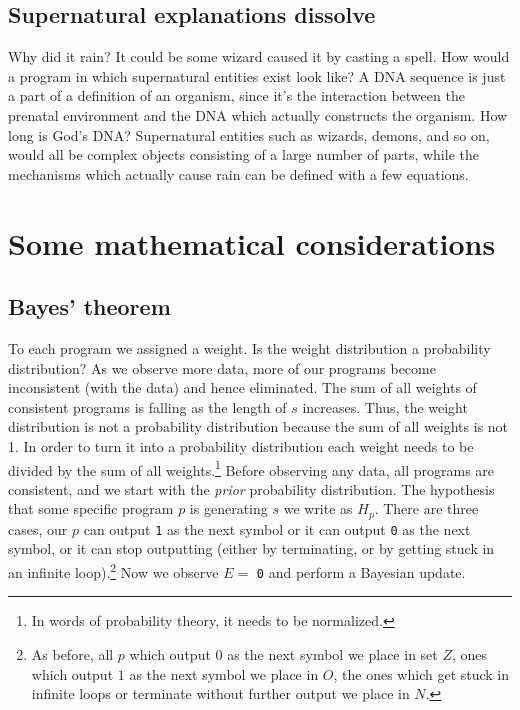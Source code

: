 \documentclass[oneside,hidelinks]{article}
\begin{document}
\newpage

\subsection{Supernatural explanations dissolve}

Why did it rain?
It could be some wizard caused it by casting a spell.
How would a program in which supernatural entities exist look like?
A DNA sequence is just a part of a definition of an organism, since it's the interaction between the prenatal environment and the DNA which actually constructs the organism.
How long is God's DNA?
Supernatural entities such as wizards, demons, and so on, would all be complex objects consisting of a large number of parts, while the mechanisms which actually cause rain can be defined with a few equations.

\newpage

\section{Some mathematical considerations}

\subsection{Bayes' theorem}

To each program we assigned a weight.
Is the weight distribution a probability distribution?
As we observe more data, more of our programs become inconsistent (with the data) and hence eliminated.
The sum of all weights of consistent programs is falling as the length of $s$ increases.
Thus, the weight distribution is not a probability distribution because the sum of all weights is not 1.
In order to turn it into a probability distribution each weight needs to be divided by the sum of all weights.\footnote{
In words of probability theory, it needs to be normalized.
}
Before observing any data, all programs are consistent, and we start with the \textit{prior} probability distribution.
The hypothesis that some specific program $p$ is generating $s$ we write as $H_{p}$.
There are three cases, our $p$ can output \texttt{1} as the next symbol or it can output \texttt{0} as the next symbol, or it can stop outputting (either by terminating, or by getting stuck in an infinite loop).\footnote{
As before, all $p$ which output $0$ as the next symbol we place in set $Z$, ones which output $1$ as the next symbol we place in $O$, the ones which get stuck in infinite loops or terminate without further output we place in $N$.}
Now we observe $E =$ \texttt{0} and perform a Bayesian update.
\end{document}
